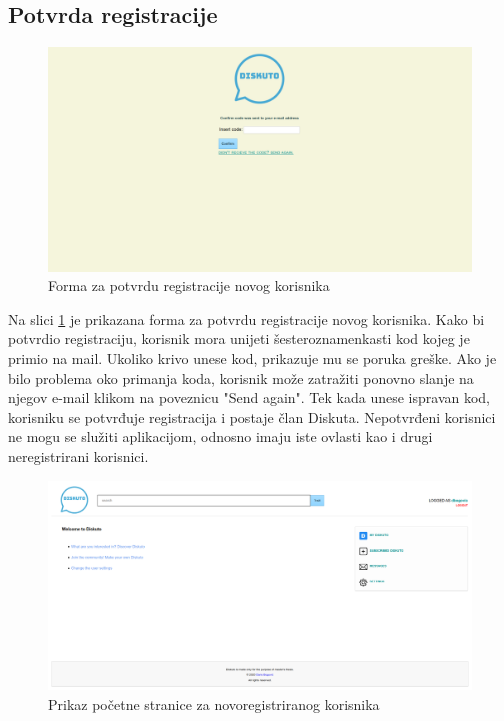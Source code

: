 \documentclass{foi}
\begin{document}
\subsection{Potvrda registracije}

\begin{figure}[h!]
    \centering
    \includegraphics[width=1\textwidth]{slike/potvrda-registracije.png}
    \caption{Forma za potvrdu registracije novog korisnika}
    \label{potvrda-registracije}
\end{figure}

Na slici \ref{potvrda-registracije} je prikazana forma za potvrdu registracije novog korisnika. Kako bi potvrdio registraciju, korisnik mora unijeti šesteroznamenkasti kod kojeg je primio na mail. Ukoliko krivo unese kod, prikazuje mu se poruka greške. Ako je bilo problema oko primanja koda, korisnik može zatražiti ponovno slanje na njegov e-mail klikom na poveznicu "Send again". Tek kada unese ispravan kod, korisniku se potvrđuje registracija i postaje član Diskuta. Nepotvrđeni korisnici ne mogu se služiti aplikacijom, odnosno imaju iste ovlasti kao i drugi neregistrirani korisnici.

\begin{figure}[h!]
    \centering
    \includegraphics[width=1\textwidth]{slike/novoregistrirani-pocetna.png}
    \caption{Prikaz početne stranice za novoregistriranog korisnika}
    \label{novoregistrirani-pocetna}
\end{figure}
\end{document}
